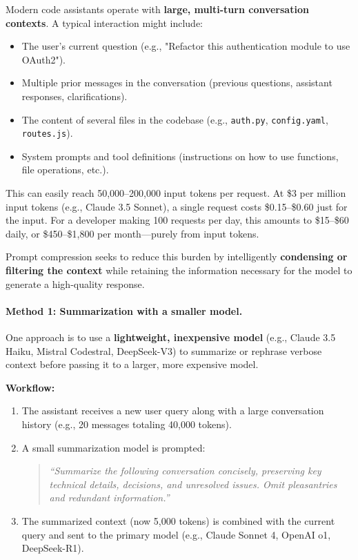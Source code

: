 \documentclass[english]{article}
\begin{document}
Modern code assistants operate with \textbf{large, multi-turn conversation contexts}. A typical interaction might include:
\begin{itemize}
    \item The user's current question (e.g., "Refactor this authentication module to use OAuth2").
    \item Multiple prior messages in the conversation (previous questions, assistant responses, clarifications).
    \item The content of several files in the codebase (e.g., \texttt{auth.py}, \texttt{config.yaml}, \texttt{routes.js}).
    \item System prompts and tool definitions (instructions on how to use functions, file operations, etc.).
\end{itemize}

This can easily reach 50,000--200,000 input tokens per request. At \$3 per million input tokens (e.g., Claude 3.5 Sonnet), a single request costs \$0.15--\$0.60 just for the input. For a developer making 100 requests per day, this amounts to \$15--\$60 daily, or \$450--\$1,800 per month—purely from input tokens.

Prompt compression seeks to reduce this burden by intelligently \textbf{condensing or filtering the context} while retaining the information necessary for the model to generate a high-quality response.

\paragraph{Method 1: Summarization with a smaller model.}

One approach is to use a \textbf{lightweight, inexpensive model} (e.g., Claude 3.5 Haiku, Mistral Codestral, DeepSeek-V3) to summarize or rephrase verbose context before passing it to a larger, more expensive model.

\textbf{Workflow:}
\begin{enumerate}
    \item The assistant receives a new user query along with a large conversation history (e.g., 20 messages totaling 40,000 tokens).
    \item A small summarization model is prompted:
    \begin{quote}
    \textit{``Summarize the following conversation concisely, preserving key technical details, decisions, and unresolved issues. Omit pleasantries and redundant information.''}
    \end{quote}
    \item The summarized context (now 5,000 tokens) is combined with the current query and sent to the primary model (e.g., Claude Sonnet 4, OpenAI o1, DeepSeek-R1).
\end{enumerate}
\end{document}
